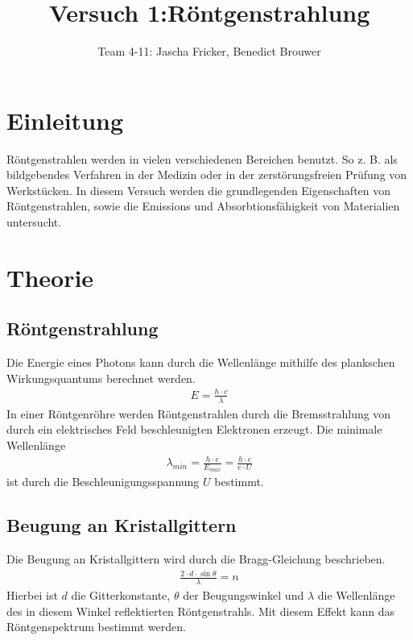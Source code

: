 \documentclass[11pt, a4paper]{article}
\title{Versuch 1:Röntgenstrahlung}
\author{Team 4-11: Jascha Fricker, Benedict Brouwer}
\begin{document}
    \maketitle

    \tableofcontents

    \newpage

    \section{Einleitung}

    Röntgenstrahlen werden in vielen verschiedenen Bereichen benutzt. So z. B. als bildgebendes Verfahren in der Medizin oder in der zerstörungsfreien Prüfung von Werkstücken. In diesem Versuch werden die grundlegenden Eigenschaften von Röntgenstrahlen, sowie die Emissions und Absorbtionsfähigkeit von Materialien untersucht.

    \section{Theorie}

    \subsection{Röntgenstrahlung}

    Die Energie eines Photons kann durch die Wellenlänge mithilfe des plankschen Wirkungsquantums berechnet werden.
    \begin{align}
        E = \frac{h \cdot c}{\lambda}
    \end{align}
    In einer Röntgenröhre werden Röntgenstrahlen durch die Bremsstrahlung von durch ein elektrisches Feld beschleunigten Elektronen erzeugt. Die minimale Wellenlänge
    \begin{align}
        \lambda_{min} = \frac{h \cdot c}{E_{max}} = \frac{h \cdot c}{e \cdot U}
    \end{align}
    ist durch die Beschleunigungsspannung $U$ bestimmt.

    \subsection{Beugung an Kristallgittern}

    Die Beugung an Kristallgittern wird durch die Bragg-Gleichung beschrieben.
    \begin{align}
        \frac{2 \cdot d \cdot \sin \theta}{\lambda} = n
    \end{align}
    Hierbei ist $d$ die Gitterkonstante, $\theta$ der Beugungswinkel und $\lambda$ die Wellenlänge des in diesem Winkel reflektierten Röntgenstrahls. Mit diesem Effekt kann das Röntgenspektrum bestimmt werden.
\end{document}
